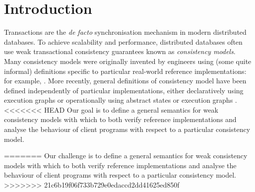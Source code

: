 \section{Introduction}
\label{sec:intro}

Transactions are the \emph{de facto} synchronisation mechanism in
modern distributed databases. To achieve scalability and performance,
distributed databases often use weak transactional consistency
guarantees known as \emph{consistency models}.  Many consistency
models were originally invented by engineers using (some quite
informal) definitions specific to particular real-world reference
implementations: for example,
\cite{ramp,si,distrsi,clocksi,cops,PSI-RA,NMSI,PSI}.
More recently, general definitions of consistency model have been
defined independently of particular implementations, either
declaratively using execution graphs \cite{adya,ev_transactions} or
operationally using abstract 
states or execution graphs
\cite{seebelieve,alonetogether,sureshConcur}. 
<<<<<<< HEAD
Our goal  is to define a general semantics for weak consistency
models  with which to both 
verify  reference  implementations {and} analyse 
the behaviour of client programs with respect to a particular consistency
model. 





=======
Our challenge  is to define a general semantics for weak consistency
models with which to both verify reference implementations and analyse 
the behaviour of client programs with respect to a particular consistency model. 
>>>>>>> 21c6b19f06f733b729e0edaccd2dd41625ed850f

